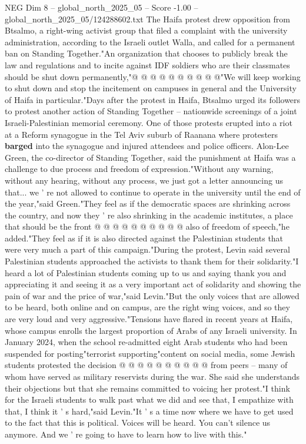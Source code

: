 \begin{textsample}{NEG Dim 8 – global\_north\_2025\_05 – Score -1.00 – global\_north\_2025\_05/124288602.txt}
The Haifa protest drew opposition from Btsalmo, a right-wing activist group that filed a complaint with the university administration, according to the Israeli outlet Walla, and called for a permanent ban on Standing Together."An organization that chooses to publicly break the law and regulations and to incite against IDF soldiers who are their classmates should be shut down permanently,"@ @ @ @ @ @ @ @ @ @"We will keep working to shut down and stop the incitement on campuses in general and the University of Haifa in particular."Days after the protest in Haifa, Btsalmo urged its followers to protest another action of Standing Together -- nationwide screenings of a joint Israeli-Palestinian memorial ceremony.
One of those protests erupted into a riot at a Reform synagogue in the Tel Aviv suburb of Raanana where protesters \textbf{barged} into the synagogue and injured attendees and police officers.
Alon-Lee Green, the co-director of Standing Together, said the punishment at Haifa was a challenge to due process and freedom of expression."Without any warning, without any hearing, without any process, we just got a letter announcing us that... we ' re not allowed to continue to operate in the university until the end of the year,"said Green."They feel as if the democratic spaces are shrinking across the country, and now they ' re also shrinking in the academic institutes, a place that should be the front @ @ @ @ @ @ @ @ @ @ also of freedom of speech,"he added."They feel as if it is also directed against the Palestinian students that were very much a part of this campaign."During the protest, Levin said several Palestinian students approached the activists to thank them for their solidarity."I heard a lot of Palestinian students coming up to us and saying thank you and appreciating it and seeing it as a very important act of solidarity and showing the pain of war and the price of war,"said Levin."But the only voices that are allowed to be heard, both online and on campus, are the right wing voices, and so they are very loud and very aggressive."Tensions have flared in recent years at Haifa, whose campus enrolls the largest proportion of Arabs of any Israeli university.
In January 2024, when the school re-admitted eight Arab students who had been suspended for posting"terrorist supporting"content on social media, some Jewish students protested the decision @ @ @ @ @ @ @ @ @ @ from peers -- many of whom have served as military reservists during the war.
She said she understands their objections but that she remains committed to voicing her protest."I think for the Israeli students to walk past what we did and see that, I empathize with that, I think it ' s hard,"said Levin."It ' s a time now where we have to get used to the fact that this is political.
Voices will be heard.
You can't silence us anymore.
And we ' re going to have to learn how to live with this."

\end{textsample}
